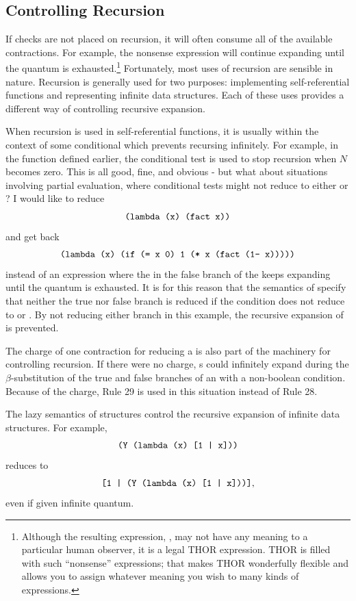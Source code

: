 \subsection{Controlling Recursion}

If checks are not placed on recursion, it will often consume all of the
available contractions. For example, the nonsense expression  will
continue expanding until the quantum is exhausted.\footnote{Although the
resulting expression, , may not have any meaning to a
particular human observer, it is a legal THOR expression. THOR is filled with
such ``nonsense'' expressions; that makes THOR wonderfully flexible and allows
you to assign whatever meaning you wish to many kinds of expressions.}
Fortunately, most uses of recursion are sensible in nature. Recursion is
generally used for two purposes: implementing self-referential functions and
representing infinite data structures. Each of these uses provides a different
way of controlling recursive expansion.

When recursion is used in self-referential functions, it is usually within the
context of some conditional which prevents recursing infinitely. For example, in
the  function defined earlier, the conditional test  is
used to stop recursion when \(N\) becomes zero. This is all good, fine, and
obvious - but what about situations involving partial evaluation, where
conditional tests might not reduce to either  or ? I
would like to reduce
\[
\texttt{(lambda (x) (fact x))}
\]
and get back
\[
\texttt{(lambda (x) (if (= x 0) 1 (* x (fact (1- x)))))}
\]
instead of an expression where the  in the false branch of the
 keeps expanding until the quantum is exhausted. It is for this reason
that the semantics of  specify that neither the true nor false branch
is reduced if the condition does not reduce to  or . By
not reducing either branch in this example, the recursive expansion of
 is prevented.

The charge of one contraction for reducing a  is also part of the
machinery for controlling recursion. If there were no charge, s could
infinitely expand during the \(\beta\)-substitution of the true and false
branches of an  with a non-boolean condition. Because of the charge,
Rule 29 is used in this situation instead of Rule 28.

The lazy semantics of structures control the recursive expansion of infinite
data structures. For example,
\[
\texttt{(Y (lambda (x) [1 | x]))}
\]
reduces to
\[
\texttt{[1 | (Y (lambda (x) [1 | x]))]},
\]
even if given infinite quantum.

